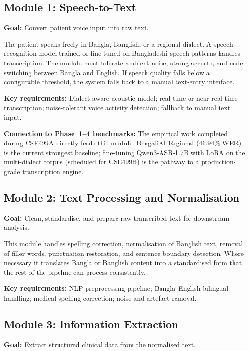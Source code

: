 \documentclass[12pt,a4paper]{article}
\begin{document}
\subsection{Module 1: Speech-to-Text}
\label{sec:m1}

\textbf{Goal:} Convert patient voice input into raw text.

The patient speaks freely in Bangla, Banglish, or a regional dialect.
A speech recognition model trained or fine-tuned on Bangladeshi speech
patterns handles transcription. The module must tolerate ambient noise,
strong accents, and code-switching between Bangla and English. If
speech quality falls below a configurable threshold, the system falls
back to a manual text-entry interface.

\textbf{Key requirements:} Dialect-aware acoustic model; real-time or
near-real-time transcription; noise-tolerant voice activity detection;
fallback to manual text input.

\textbf{Connection to Phase~1--4 benchmarks:} The empirical work
completed during CSE499A directly feeds this module. BengaliAI Regional
(46.94\% WER) is the current strongest baseline; fine-tuning
Qwen3-ASR-1.7B with LoRA on the multi-dialect corpus (scheduled for
CSE499B) is the pathway to a production-grade transcription engine.

\subsection{Module 2: Text Processing and Normalisation}
\label{sec:m2}

\textbf{Goal:} Clean, standardise, and prepare raw transcribed text for
downstream analysis.

This module handles spelling correction, normalisation of Banglish text,
removal of filler words, punctuation restoration, and sentence boundary
detection. Where necessary it translates Bangla or Banglish content into
a standardised form that the rest of the pipeline can process
consistently.

\textbf{Key requirements:} NLP preprocessing pipeline; Bangla--English
bilingual handling; medical spelling correction; noise and artefact
removal.

\subsection{Module 3: Information Extraction}
\label{sec:m3}

\textbf{Goal:} Extract structured clinical data from the normalised
text.
\end{document}
